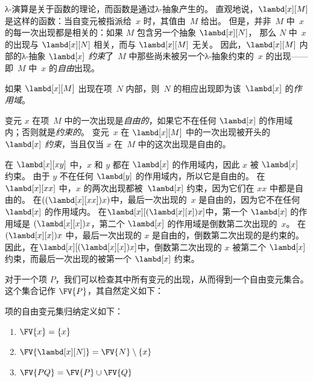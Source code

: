 \documentclass[../../../include/open-logic-section]{subfiles}
\begin{document}

λ-演算是关于函数的理论，而函数是通过λ-抽象产生的。
直观地说，$\lambd[x][M]$ 是这样的函数：当自变元被指派给~$x$ 时，其值由~$M$ 给出。
但是，并非~$M$ 中~$x$ 的每一次出现都是相关的：如果 $M$ 包含另一个抽象 $\lambd[x][N]$，
那么 $N$ 中~$x$ 的出现与 $\lambd[x][N]$ 相关，而与 $\lambd[x][M]$ 无关。
因此，$\lambd[x][M]$ 内部的λ-抽象 $\lambd[x]$ \emph{约束}了~$M$ 中那些尚未被另一个λ-抽象约束的~$x$ 的出现——即~$M$ 中~$x$ 的\emph{自由}出现。

\begin{defn}[作用域]
如果 $\lambd[x][M]$ 出现在项~$N$ 内部，则~$N$ 的相应出现即为该~$\lambd[x]$ 的\emph{作用域}。
\end{defn}


\begin{defn}[自由出现与约束出现]
  变元 $x$ 在项~$M$ 中的一次出现是\emph{自由的}，如果它不在任何 $\lambd[x]$ 的作用域内；否则就是\emph{约束的}。
  变元~$x$ 在 $\lambd[x][M]$ 中的一次出现被开头的 $\lambd[x]$ \emph{约束}，当且仅当 $x$ 在~$M$ 中的这次出现是自由的。
\end{defn}

\begin{ex}
  在 $\lambd[x][x y]$ 中，$x$ 和 $y$ 都在 $\lambd[x]$ 的作用域内，因此 $x$ 被 $\lambd[x]$ 约束。
  由于 $y$ 不在任何 $\lambd[y]$ 的作用域内，所以它是自由的。
  在 $\lambd[x][x x]$ 中，$x$ 的两次出现都被~$\lambd[x]$ 约束，因为它们在 $xx$ 中都是自由的。
  在$((\lambd[x][xx])x)$中，最后一次出现的~$x$ 是自由的，因为它不在任何 $\lambd[x]$ 的作用域内。
  在$\lambd[x][(\lambd[x][x])x]$中，第一个 $\lambd[x]$ 的作用域是 $(\lambd[x][x])x$，第二个 $\lambd[x]$ 的作用域是倒数第二次出现的~$x$。
  在 $(\lambd[x][x])x$ 中，最后一次出现的 $x$ 是自由的，倒数第二次出现的是约束的。
  因此，在$\lambd[x][(\lambd[x][x])x]$中，倒数第二次出现的 $x$ 被第二个 $\lambd[x]$ 约束，而最后一次出现的被第一个 $\lambd[x]$ 约束。
\end{ex}

对于一个项 $P$，我们可以检查其中所有变元的出现，从而得到一个自由变元集合。
这个集合记作 $\FV{P}$，其自然定义如下：

\begin{defn}[项的自由变元] 
  项的自由变元集归纳定义如下：
  \begin{enumerate}
    \item $\FV{x} = \{x\}$ 
    \item $\FV{\lambd[x][N]} = \FV{N} \setminus \{x\}$    
    \item $\FV{PQ} = \FV{P} \cup \FV{Q}$ 
  \end{enumerate}
\end{defn}
\end{document}
